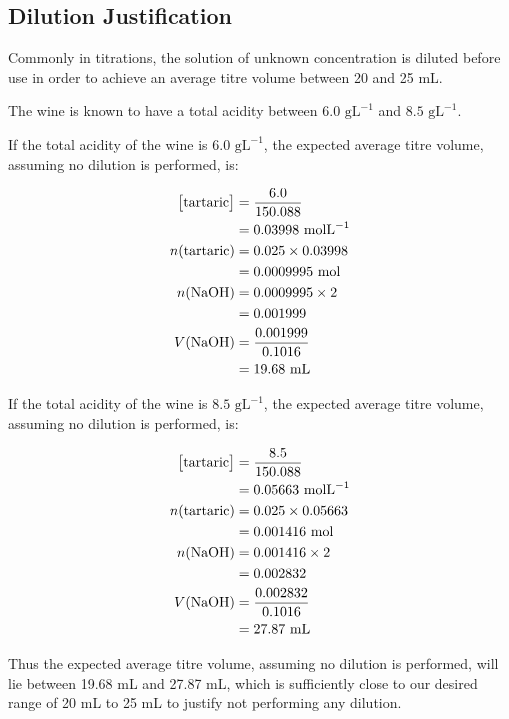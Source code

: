 \documentclass[a4paper,11pt]{article}
\begin{document}
\pagebreak


\subsection{Dilution Justification}

Commonly in titrations, the solution of unknown concentration is diluted before
use in order to achieve an average titre volume between 20 and 25 mL.

The wine is known to have a total acidity between $6.0\mbox{ gL}^{-1}$ and
$8.5\mbox{ gL}^{-1}$.

If the total acidity of the wine is $6.0\mbox{ gL}^{-1}$, the expected average
titre volume, assuming no dilution is performed, is:

$$
\begin{aligned}
\big[\mbox{tartaric}\big] & = \frac{6.0}{150.088} \\
& = 0.03998\mbox{ molL}^{-1} \\
n(\mbox{tartaric}) & = 0.025 \times 0.03998 \\
& = 0.0009995\mbox{ mol} \\
n(\ce{NaOH}) & = 0.0009995 \times 2 \\
& = 0.001999 \\
V(\ce{NaOH}) & = \frac{0.001999}{0.1016} \\
& = 19.68\mbox{ mL} \\
\end{aligned}
$$

If the total acidity of the wine is $8.5\mbox{ gL}^{-1}$, the expected average
titre volume, assuming no dilution is performed, is:

$$
\begin{aligned}
\big[\mbox{tartaric}\big] & = \frac{8.5}{150.088} \\
& = 0.05663\mbox{ molL}^{-1} \\
n(\mbox{tartaric}) & = 0.025 \times 0.05663 \\
& = 0.001416\mbox{ mol} \\
n(\ce{NaOH}) & = 0.001416 \times 2 \\
& = 0.002832 \\
V(\ce{NaOH}) & = \frac{0.002832}{0.1016} \\
& = 27.87\mbox{ mL} \\
\end{aligned}
$$

Thus the expected average titre volume, assuming no dilution is performed, will
lie between 19.68 mL and 27.87 mL, which is sufficiently close to our desired
range of 20 mL to 25 mL to justify not performing any dilution.
\end{document}
